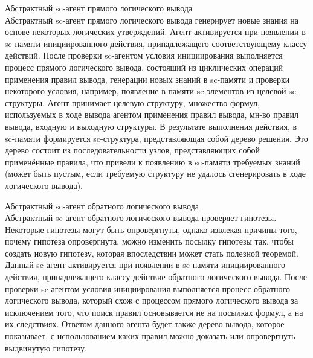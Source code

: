 \begin{frame}{Абстрактный sc-агент прямого логического вывода}
\topline
\vspace{40pt}
 \\
 
  Абстрактный sc-агент прямого логического вывода генерирует новые знания на основе некоторых логических утверждений. Агент активируется при появлении в sc-памяти инициированного действия, принадлежащего соответствующему классу действий. После проверки sc-агентом условия инициирования выполняется процесс прямого логического вывода, состоящий из циклических операций применения правил вывода, генерации новых знаний в sc-памяти и проверки некоторого условия, например, появление в памяти sc-элементов из целевой sc-структуры. Агент принимает целевую структуру, множество формул, используемых в ходе вывода агентом применения правил вывода, мн-во правил вывода, входную и выходную структуры. В результате выполнения действия, в sc-памяти формируется sc-структура, представляющая собой дерево решения. Это дерево состоит из последовательности узлов, представляющих собой применённые правила, что привели к появлению в sc-памяти требуемых знаний (может быть пустым, если требуемую структуру не удалось сгенерировать в ходе логического вывода).  
\end{frame}


\begin{frame}{Абстрактный sc-агент обратного логического вывода}
\topline
\vspace{30pt}
 \\

  Абстрактный sc-агент обратного логического вывода проверяет гипотезы. Некоторые гипотезы могут быть опровергнуты, однако извлекая причины того, почему гипотеза опровергнута, можно изменить посылку гипотезы так, чтобы создать новую гипотезу, которая впоследствии может стать полезной теоремой. Данный sc-агент активируется при появлении в sc-памяти инициированного действия, принадлежащего классу действие обратного логического вывода. После проверки sc-агентом условия инициирования выполняется процесс обратного логического вывода, который схож с процессом прямого логического вывода за исключением того, что поиск правил основывается не на посылках формул, а на их следствиях. Ответом данного агента будет также дерево вывода, которое показывает, с использованием каких правил можно доказать или опровергнуть выдвинутую гипотезу. 
\end{frame}

